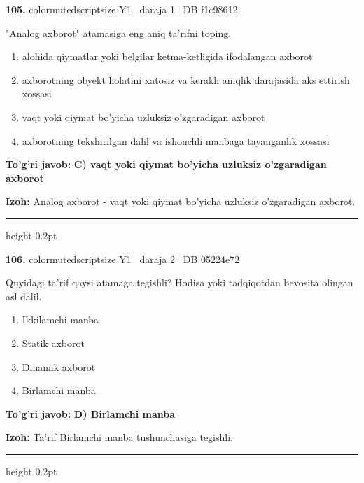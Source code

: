 \documentclass[10pt,a4paper,oneside]{article}
\begin{document}
\noindent\textbf{\color{ink}105.}  {color{muted}scriptsize Y1 \textbullet\ daraja 1 \textbullet\ DB f1c98612}
\par
"Analog axborot" atamasiga eng aniq ta'rifni toping.
\begin{enumerate}[label=\Alph*),leftmargin=9mm]
\item alohida qiymatlar yoki belgilar ketma-ketligida ifodalangan axborot
\item axborotning obyekt holatini xatosiz va kerakli aniqlik darajasida aks ettirish xossasi
\item vaqt yoki qiymat bo'yicha uzluksiz o'zgaradigan axborot
\item axborotning tekshirilgan dalil va ishonchli manbaga tayanganlik xossasi
\end{enumerate}
\begin{tcolorbox}[enhanced,breakable,colback=teal!4,colframe=teal!50!black,boxrule=0.5pt,arc=1.1mm,left=3mm,right=3mm,top=1.7mm,bottom=1.7mm,before skip=2mm,after skip=2mm]
\textbf{\color{teal}To'g'ri javob:} \textbf{C) vaqt yoki qiymat bo'yicha uzluksiz o'zgaradigan axborot}
\par\smallskip
\textbf{Izoh:} Analog axborot - vaqt yoki qiymat bo'yicha uzluksiz o'zgaradigan axborot.
\end{tcolorbox}
\vspace{2mm}\hrule height 0.2pt \vspace{3mm}

\noindent\textbf{\color{ink}106.}  {color{muted}scriptsize Y1 \textbullet\ daraja 2 \textbullet\ DB 05224e72}
\par
Quyidagi ta'rif qaysi atamaga tegishli? Hodisa yoki tadqiqotdan bevosita olingan asl dalil.
\begin{enumerate}[label=\Alph*),leftmargin=9mm]
\item Ikkilamchi manba
\item Statik axborot
\item Dinamik axborot
\item Birlamchi manba
\end{enumerate}
\begin{tcolorbox}[enhanced,breakable,colback=teal!4,colframe=teal!50!black,boxrule=0.5pt,arc=1.1mm,left=3mm,right=3mm,top=1.7mm,bottom=1.7mm,before skip=2mm,after skip=2mm]
\textbf{\color{teal}To'g'ri javob:} \textbf{D) Birlamchi manba}
\par\smallskip
\textbf{Izoh:} Ta'rif Birlamchi manba tushunchasiga tegishli.
\end{tcolorbox}
\vspace{2mm}\hrule height 0.2pt \vspace{3mm}
\end{document}
